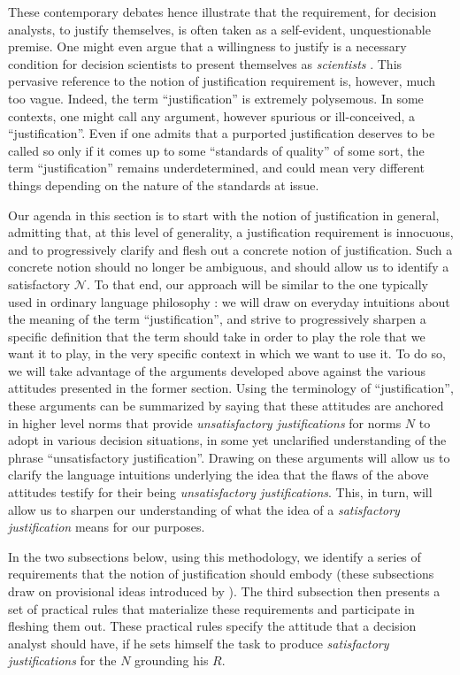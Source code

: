 \documentclass[preprint, french, english, 11pt, authoryear]{elsarticle}%
\newcommand{\adv}{\mathscr{N}}
\begin{document}
These contemporary debates hence illustrate that the requirement, for decision analysts, to justify themselves, is often taken as a self-evident, unquestionable premise. One might even argue that a willingness to justify is a necessary condition for decision scientists to present themselves as \emph{scientists} \citep{ormerod_justifying_2010}. This pervasive reference to the notion of justification requirement is, however, much too vague. Indeed, the term ``justification'' is extremely polysemous. In some contexts, one might call any argument, however spurious or ill-conceived, a ``justification''. Even if one admits that a purported justification deserves to be called so only if it comes up to some ``standards of quality'' of some sort, the term ``justification'' remains underdetermined, and could mean very different things depending on the nature of the standards at issue.

Our agenda in this section is to start with the notion of justification in general, admitting that, at this level of generality, a justification requirement is innocuous, and to progressively clarify and flesh out a concrete notion of justification. Such a concrete notion should no longer be ambiguous, and should allow us to identify a satisfactory $\adv$. To that end, our approach will be similar to the one typically used in ordinary language philosophy \citep{soames_philosophical_2003}: we will draw on everyday intuitions about the meaning of the term ``justification'', and strive to progressively sharpen a specific definition that the term should take in order to play the role that we want it to play, in the very specific context in which we want to use it. To do so, we will take advantage of the arguments developed above against the various attitudes presented in the former section. Using the terminology of ``justification'', these arguments can be summarized by saying that these attitudes are anchored in higher level norms that provide \emph{unsatisfactory justifications} for norms $N$ to adopt in various decision situations, in some yet unclarified understanding of the phrase ``unsatisfactory justification''. Drawing on these arguments will allow us to clarify the language intuitions underlying the idea that the flaws of the above attitudes testify for their being \emph{unsatisfactory justifications}. This, in turn, will allow us to sharpen our understanding of what the idea of a \emph{satisfactory justification} means for our purposes.

In the two subsections below, using this methodology, we identify a series of requirements that the notion of justification should embody (these subsections draw on provisional ideas introduced by \citet{meinard_du_2013, meinard_what_2017}). The third subsection then presents a set of practical rules that materialize these requirements and participate in fleshing them out. These practical rules specify the attitude that a decision analyst should have, if he sets himself the task to produce \emph{satisfactory justifications} for the $N$ grounding his $R$.
\end{document}
